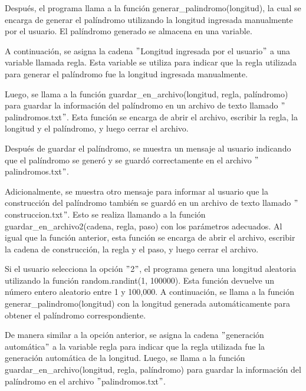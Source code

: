 Después, el programa llama a la función generar\_palindromo(longitud), la cual se encarga de generar el palíndromo utilizando la longitud ingresada manualmente por el usuario. El palíndromo generado se almacena en una variable.\newline

A continuación, se asigna la cadena $"$Longitud ingresada por el usuario$"$ a una variable llamada regla. Esta variable se utiliza para indicar que la regla utilizada para generar el palíndromo fue la longitud ingresada manualmente.\newline

Luego, se llama a la función guardar\_en\_archivo(longitud, regla, palíndromo) para guardar la información del palíndromo en un archivo de texto llamado $"$palindromos.txt$"$. Esta función se encarga de abrir el archivo, escribir la regla, la longitud y el palíndromo, y luego cerrar el archivo.\newline

Después de guardar el palíndromo, se muestra un mensaje al usuario indicando que el palíndromo se generó y se guardó correctamente en el archivo $"$palindromos.txt$"$.\newline

Adicionalmente, se muestra otro mensaje para informar al usuario que la construcción del palíndromo también se guardó en un archivo de texto llamado $"$construccion.txt$"$. Esto se realiza llamando a la función guardar\_en\_archivo2(cadena, regla, paso) con los parámetros adecuados. Al igual que la función anterior, esta función se encarga de abrir el archivo, escribir la cadena de construcción, la regla y el paso, y luego cerrar el archivo.\newline

Si el usuario selecciona la opción $"$2$"$, el programa genera una longitud aleatoria utilizando la función random.randint(1, 100000). Esta función devuelve un número entero aleatorio entre 1 y 100,000. A continuación, se llama a la función generar\_palindromo(longitud) con la longitud generada automáticamente para obtener el palíndromo correspondiente.\newline

De manera similar a la opción anterior, se asigna la cadena $"$generación automática$"$ a la variable regla para indicar que la regla utilizada fue la generación automática de la longitud. Luego, se llama a la función guardar\_en\_archivo(longitud, regla, palíndromo) para guardar la información del palíndromo en el archivo $"$palindromos.txt$"$.\newline

